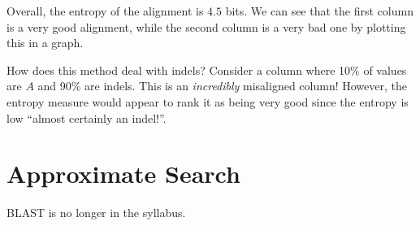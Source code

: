 \documentclass[10pt,\jkfside,a4paper]{article}
\begin{document}
\begin{enumerate}
    Overall, the entropy of the alignment is $4.5$ bits. We can see that the first column is a very good alignment, while the second column is a very bad one by plotting this in a graph.

    \begin{question}[Indels]

        How does this method deal with indels? Consider a column where 10\% of values are $A$ and 90\% are indels. This is an \textit{incredibly} misaligned column! However, the entropy measure would
        appear to rank it as being very good since the entropy is low \ie ``almost certainly an indel!''.

    \end{question}

\end{enumerate}

\section{Approximate Search}

BLAST is no longer in the syllabus.
\end{document}
